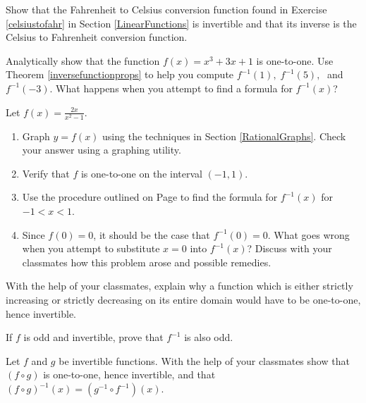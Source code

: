\documentclass{ximera}
\begin{document}
\begin{problem}
Show that the Fahrenheit to Celsius conversion function found in Exercise \ref{celsiustofahr} in Section \ref{LinearFunctions} is invertible and that its inverse is the Celsius to Fahrenheit conversion function. 
\end{problem}

\begin{problem}
Analytically show that the function $f(x) = x^3 + 3x + 1$ is one-to-one.  Use Theorem \ref{inversefunctionprops} to help you compute $f^{-1}(1), \; f^{-1}(5), \;$ and $f^{-1}(-3)$.  What happens when you attempt to find a formula for $f^{-1}(x)$?
\end{problem}

\begin{problem}
Let $f(x) = \frac{2x}{x^2-1}$.

\begin{enumerate}
\item
Graph $y = f(x)$ using the techniques  in Section \ref{RationalGraphs}.  Check your answer using a graphing utility.

\item 
Verify that $f$ is one-to-one on the interval $(-1,1)$.

\item 
Use the procedure outlined on Page \pageref{inverseprocedure} to find the formula for $f^{-1}(x)$ for $-1 < x < 1$.

\item 
Since $f(0) = 0$, it should be the case that $f^{-1}(0) = 0$.  What goes wrong when you attempt to substitute $x=0$ into $f^{-1}(x)$?  Discuss with your classmates how this problem arose and possible remedies.

\end{enumerate}
\end{problem}

\begin{problem}
With the help of your classmates, explain why a function which is either strictly increasing or strictly decreasing on its entire domain would have to be one-to-one, hence invertible.
\end{problem}

\begin{problem}
If $f$ is odd and invertible, prove that $f^{-1}$ is also odd.
\end{problem}

\begin{problem}\label{fcircginverse}
Let $f$ and $g$ be invertible functions.  With the help of your classmates show that $(f \circ g)$ is one-to-one, hence invertible, and that $(f \circ g)^{-1}(x) = (g^{-1} \circ f^{-1})(x)$.
\end{problem}
\end{document}
